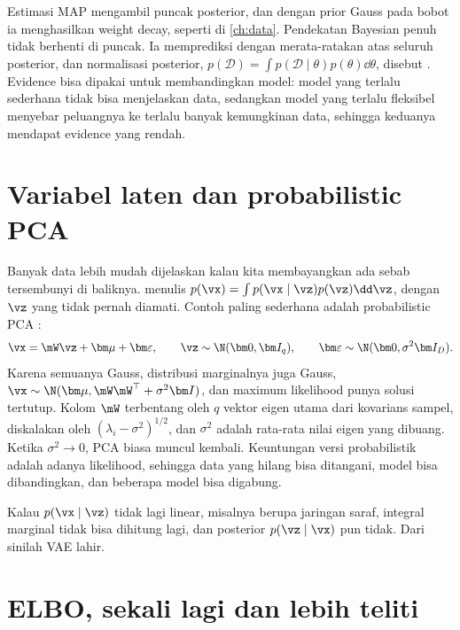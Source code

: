 Estimasi MAP mengambil puncak posterior, dan dengan prior Gauss pada bobot ia menghasilkan weight
decay, seperti di \cref{ch:data}. Pendekatan Bayesian penuh tidak berhenti di puncak. Ia
memprediksi dengan merata-ratakan atas seluruh posterior, dan normalisasi posterior,
$p(\mathcal D)=\int p(\mathcal D\mid\theta)p(\theta)\dd\theta$, disebut . Evidence
bisa dipakai untuk membandingkan model: model yang terlalu sederhana tidak bisa menjelaskan data,
sedangkan model yang terlalu fleksibel menyebar peluangnya ke terlalu banyak kemungkinan data,
sehingga keduanya mendapat evidence yang rendah.

\section{Variabel laten dan probabilistic PCA}

Banyak data lebih mudah dijelaskan kalau kita membayangkan ada sebab tersembunyi di baliknya.
 menulis $p(\vx)=\int p(\vx\mid\vz)p(\vz)\dd\vz$, dengan $\vz$ yang
tidak pernah diamati. Contoh paling sederhana adalah probabilistic PCA \citep{tipping1999}:
\begin{equation}
\vx=\mW\vz+\bm\mu+\bm\varepsilon,\qquad \vz\sim\N(\bm0,\bm I_q),\qquad \bm\varepsilon\sim\N(\bm0,\sigma^2\bm I_D).
\end{equation}
Karena semuanya Gauss, distribusi marginalnya juga Gauss, $\vx\sim\N(\bm\mu,\mW\mW^\top+\sigma^2\bm I)$,
dan maximum likelihood punya solusi tertutup. Kolom $\mW$ terbentang oleh $q$ vektor eigen
utama dari kovarians sampel, diskalakan oleh $(\lambda_i-\sigma^2)^{1/2}$, dan $\sigma^2$ adalah
rata-rata nilai eigen yang dibuang. Ketika $\sigma^2\to0$, PCA biasa muncul kembali. Keuntungan
versi probabilistik adalah adanya likelihood, sehingga data yang hilang bisa ditangani, model
bisa dibandingkan, dan beberapa model bisa digabung.

Kalau $p(\vx\mid\vz)$ tidak lagi linear, misalnya berupa jaringan saraf, integral marginal tidak
bisa dihitung lagi, dan posterior $p(\vz\mid\vx)$ pun tidak. Dari sinilah VAE lahir.

\section{ELBO, sekali lagi dan lebih teliti}

